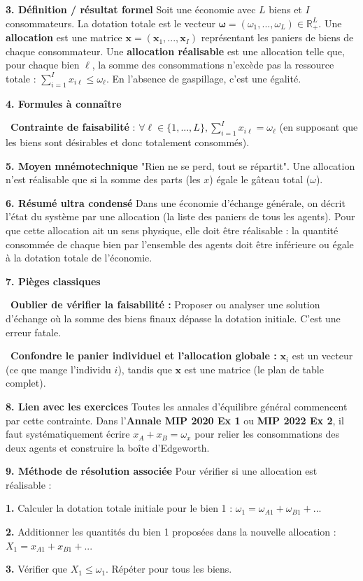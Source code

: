 \documentclass[11pt, a4paper]{report}
\begin{document}
\textbf{3. Définition / résultat formel}
Soit une économie avec $L$ biens et $I$ consommateurs.
La dotation totale est le vecteur $\mathbf{\omega} = (\omega_1, ..., \omega_L) \in \mathbb{R}^L_+$.
Une \textbf{allocation} est une matrice $\mathbf{x} = (\mathbf{x}_1, ..., \mathbf{x}_I)$ représentant les paniers de biens de chaque consommateur.
Une \textbf{allocation réalisable} est une allocation telle que, pour chaque bien $\ell$, la somme des consommations n'excède pas la ressource totale : $\sum_{i=1}^I x_{i\ell} \le \omega_\ell$. En l'absence de gaspillage, c'est une égalité.

\textbf{4. Formules à connaître}
\par \textbullet\ \textbf{Contrainte de faisabilité} : $\forall \ell \in \{1, ..., L\}, \sum_{i=1}^I x_{i\ell} = \omega_\ell$ (en supposant que les biens sont désirables et donc totalement consommés).

\textbf{5. Moyen mnémotechnique}
"Rien ne se perd, tout se répartit". Une allocation n'est réalisable que si la somme des parts (les $x$) égale le gâteau total ($\omega$).

\textbf{6. Résumé ultra condensé}
Dans une économie d'échange générale, on décrit l'état du système par une allocation (la liste des paniers de tous les agents). Pour que cette allocation ait un sens physique, elle doit être réalisable : la quantité consommée de chaque bien par l'ensemble des agents doit être inférieure ou égale à la dotation totale de l'économie.

\textbf{7. Pièges classiques}
\par \textbullet\ \textbf{Oublier de vérifier la faisabilité :} Proposer ou analyser une solution d'échange où la somme des biens finaux dépasse la dotation initiale. C'est une erreur fatale.
\par \textbullet\ \textbf{Confondre le panier individuel et l'allocation globale :} $\mathbf{x}_i$ est un vecteur (ce que mange l'individu $i$), tandis que $\mathbf{x}$ est une matrice (le plan de table complet).

\textbf{8. Lien avec les exercices}
Toutes les annales d'équilibre général commencent par cette contrainte. Dans l'\textbf{Annale MIP 2020 Ex 1} ou \textbf{MIP 2022 Ex 2}, il faut systématiquement écrire $x_A + x_B = \omega_x$ pour relier les consommations des deux agents et construire la boîte d'Edgeworth.

\textbf{9. Méthode de résolution associée}
Pour vérifier si une allocation est réalisable :
\par \textbf{1.} Calculer la dotation totale initiale pour le bien 1 : $\omega_1 = \omega_{A1} + \omega_{B1} + ...$
\par \textbf{2.} Additionner les quantités du bien 1 proposées dans la nouvelle allocation : $X_1 = x_{A1} + x_{B1} + ...$
\par \textbf{3.} Vérifier que $X_1 \le \omega_1$. Répéter pour tous les biens.
\end{document}
